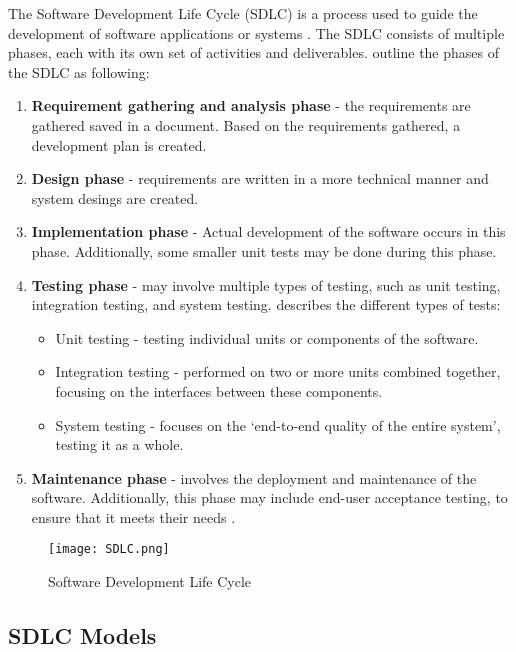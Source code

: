 The Software Development Life Cycle (SDLC) is a process used to guide the development of software applications or systems \parencite{sdlc1}. The SDLC consists of multiple phases, each with its own set of activities and deliverables. \textcite{sdlc2} outline the phases of the SDLC as following:
\begin{enumerate}
    \item \textbf{Requirement gathering and analysis phase} - the requirements are gathered saved in a document. Based on the requirements gathered, a development plan is created.
    \item \textbf{Design phase} - requirements are written in a more technical manner and system desings are created. 
    \item \textbf{Implementation phase} - Actual development of the software occurs in this phase. Additionally, some smaller unit tests may be done during this phase.
    \item \textbf{Testing phase} - may involve multiple types of testing, such as unit testing, integration testing, and system testing. \textcite{testing} describes the different types of tests:
    \begin{itemize}
    \item Unit testing - testing individual units or components of the software.
    \item Integration testing - performed on two or more units combined together, focusing on the interfaces between these components.
    \item System testing - focuses on the `end-to-end quality of the entire system', testing it as a whole.
    \end{itemize}
    \item \textbf{Maintenance phase} - involves the deployment and maintenance of the software. Additionally, this phase may include end-user acceptance testing, to ensure that it meets their needs \parencite{testing}. 
\end{enumerate}

\begin{figure}[ht]
    \centering
    \texttt{[image: SDLC.png]}
    \caption{Software Development Life Cycle}
    \label{fig:sdlc}
\end{figure}

\newpage

\subsection{SDLC Models}

